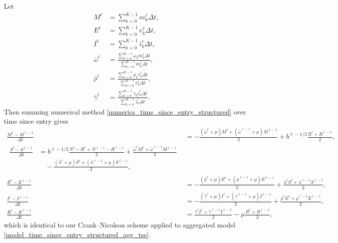 \documentclass[USenglish]{article}
\begin{document}
Let
\begin{subequations}
  \begin{align}
    M^{\ell}
    &= \sum_{k = 0}^{K - 1} m_k^{\ell} \Delta t,
    \\
    E^{\ell}
    &= \sum_{k = 0}^{K - 1} e_k^{\ell} \Delta t,
    \\
    I^{\ell}
    &= \sum_{k = 0}^{K - 1} i_k^{\ell} \Delta t,
    \\
    \bar{\omega}^{\ell}
    &= \frac{\sum_{k = 0}^{K - 1} \omega_k m_k^{\ell} \Delta t}
      {\sum_{k = 0}^{K - 1} m_k^{\ell} \Delta t},
    \\
    \bar{\rho}^{\ell}
    &= \frac{\sum_{k = 0}^{K - 1} \rho_k e_k^{\ell} \Delta t}
      {\sum_{k = 0}^{K - 1} e_k^{\ell} \Delta t},
    \\
    \bar{\gamma}^{\ell}
    &= \frac{\sum_{k = 0}^{K - 1} \gamma_k i_k^{\ell} \Delta t}
      {\sum_{k = 0}^{K - 1} i_k^{\ell} \Delta t}.
  \end{align}
\end{subequations}
Then summing numerical method
\eqref{numerics_time_since_entry_structured} over time since entry
gives
\begin{subequations}
  \label{numerics_time_since_entry_structured_agg_tse}
  \begin{align}
    \frac{M^{\ell}  - M^{\ell - 1}}{\Delta t}
    &= - \frac{(\bar{\omega}^{\ell} + \mu) M^{\ell}
      + (\bar{\omega}^{\ell - 1} + \mu) M^{\ell - 1}}{2}
      + b^{\ell - 1 / 2} \frac{R^{\ell} + R^{\ell - 1}}{2},
    \\
    \begin{split}
      \frac{S^{\ell} - S^{\ell - 1}}{\Delta t}
      &= b^{\ell - 1 / 2}
      \frac{N^{\ell} - R^{\ell} + N^{\ell - 1} - R^{\ell - 1}}{2}
      + \frac{\bar{\omega}^{\ell} M^{\ell}
        + \bar{\omega}^{\ell - 1} M^{\ell - 1}}{2}
      \\ & \quad {}
      - \frac{(\lambda^{\ell} + \mu) S^{\ell}
        + (\lambda^{\ell - 1} + \mu) S^{\ell - 1}}{2},
    \end{split}
    \\
    \frac{E^{\ell}  - E^{\ell - 1}}{\Delta t}
    &= - \frac{(\bar{\rho}^{\ell} + \mu) E^{\ell}
      + (\bar{\rho}^{\ell - 1} + \mu) E^{\ell - 1}}{2}
      + \frac{\lambda^{\ell} S^{\ell}
      + \lambda^{\ell - 1} S^{\ell - 1}}{2},
    \\
    \frac{I^{\ell}  - I^{\ell - 1}}{\Delta t}
    &= - \frac{(\bar{\gamma}^{\ell} + \mu) I^{\ell}
      + (\bar{\gamma}^{\ell - 1} + \mu) I^{\ell - 1}}{2}
      + \frac{\bar{\rho}^{\ell} E^{\ell}
      + \bar{\rho}^{\ell - 1} E^{\ell - 1}}{2},
    \\
    \frac{R^{\ell} - R^{\ell - 1}}{\Delta t}
    &= \frac{\bar{\gamma}^{\ell} I^{\ell}
      + \bar{\gamma}^{\ell - 1} I^{\ell - 1}}{2}
      - \mu \frac{R^{\ell} + R^{\ell - 1}}{2},
  \end{align}
\end{subequations}
which is identical to our Crank--Nicolson scheme applied to aggregated
model \eqref{model_time_since_entry_structured_agg_tse}.
\end{document}
